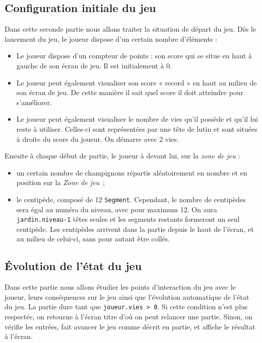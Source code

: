\subsection{Configuration initiale du jeu}
Dans cette seconde partie nous allons traiter la situation de départ du jeu. Dès le lancement du jeu, le joueur dispose d'un certain nombre d'éléments : 

\begin{itemize}
	\item Le joueur dispose d'un compteur de points : son score qui se situe en haut à gauche de son écran de jeu. Il est initialement à 0.
	\item Le joueur peut également visualiser son score « record » en haut au milieu de son écran de jeu. De cette manière il sait quel score il doit atteindre pour s'améliorer.
	\item Le joueur peut également visualiser le nombre de vies qu'il possède et qu'il lui reste à utiliser. Celles-ci sont représentées par une tête de lutin et sont situées à droite du score du joueur. On démarre avec 2 vies.
\end{itemize}

Ensuite à chaque début de partie, le joueur à devant lui, sur la \emph{zone de jeu} : 

\begin{itemize}
	\item un certain nombre de champignons répartis aléatoirement en nombre et en position sur la  \emph{Zone de jeu}~;
	\item le centipède, composé de 12 \texttt{Segment}. Cependant, le nombre de centipèdes sera égal au numéro du niveau, avec pour maximum 12. On aura \texttt{jardin.niveau-1} têtes seules et les segments restants formeront un seul centipède. Les centipèdes arrivent dans la partie depuis le haut de l'écran, et au milieu de celui-ci, sans pour autant être collés.
\end{itemize}
 

\subsection{Évolution de l'état du jeu}

Dans cette partie nous allons étudier les points d'interaction du jeu avec le joueur, leurs conséquences sur le jeu ainsi que l'évolution automatique de l'état du jeu. La partie dure tant que \texttt{joueur.vies > 0}. Si cette condition n'est plus respectée, on retourne à l'écran titre d'où on peut relancer une partie. Sinon, on vérifie les entrées, fait avancer le jeu comme décrit en partie, et affiche le résultat à l'écran.

